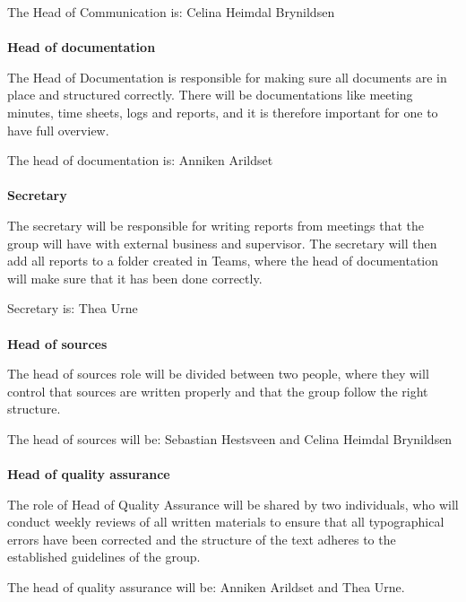 The Head of Communication is: Celina Heimdal Brynildsen
\\~\\
\textbf{Head of documentation}

The Head of Documentation is responsible for making sure all documents are in place and structured correctly. There will be documentations like meeting minutes, time sheets, logs and reports, and it is therefore important for one to have full overview.

The head of documentation is: Anniken Arildset
\\~\\
\textbf{Secretary}

The secretary will be responsible for writing reports from meetings that the group will have with external business and supervisor. 
The secretary will then add all reports to a folder created in Teams, where the head of documentation will make sure that it has been done correctly. 

Secretary is: Thea Urne 
\\~\\
\textbf{Head of sources}

The head of sources role will be divided between two people, where they will control that sources are written properly and that the group follow the right structure. 

The head of sources will be: Sebastian Hestsveen and Celina Heimdal Brynildsen
\\~\\
\textbf{Head of quality assurance }

The role of Head of Quality Assurance will be shared by two individuals, who will conduct weekly reviews of all written materials to ensure that all typographical errors have been corrected and the structure of the text adheres to the established guidelines of the group.

The head of quality assurance will be: Anniken Arildset and Thea Urne. 
\\~\\

